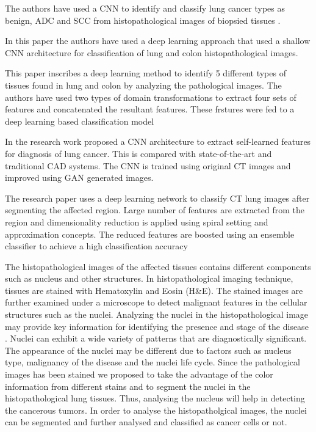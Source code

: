 \documentclass{comjnl}
\begin{document}
The authors have used a CNN to identify and classify lung cancer types as benign, ADC and SCC from histopathological images of biopsied tissues \cite{hatuwal}.

In this paper\cite{sanidhya} the authors have used a deep learning approach that used a shallow CNN architecture for classification of lung and colon histopathological images.

This paper \cite{masud} inscribes a deep learning method to identify 5 different types of tissues found in lung and colon by analyzing the pathological images. The authors have used two types of domain transformations to extract four sets of features and concatenated the resultant features. These frstures were fed to a deep learning based classification model

In \cite{suresh} the research work proposed a CNN architecture to extract self-learned features for diagnosis of lung cancer. This is compared with state-of-the-art and traditional CAD systems. The CNN is trained using original CT images and improved using GAN generated images. 

The research paper \cite{shakeel} uses a deep learning network to classify CT lung images after segmenting the affected region. Large number of features are extracted from the region and dimensionality reduction is applied using spiral setting and approximation concepts. The reduced features are boosted using an ensemble classifier to achieve a high classification accuracy


The histopathological images of the affected tissues contains different components such as nucleus and other structures.  In histopathological imaging technique, tissues are stained with Hematoxylin and Eosin (H&E). The stained images are further examined under a microscope to detect malignant features in the cellular structures such as the nuclei. Analyzing the nuclei in the histopathological image may provide key information for identifying the presence and stage of the disease \cite{confjung}. Nuclei can exhibit a wide variety of patterns that are diagnostically significant. The appearance of the nuclei may be different due to factors such as nucleus type, malignancy of the disease and the nuclei life cycle.  Since the pathological images has been stained we proposed to take the advantage of the color information from different stains and to segment the nuclei in the histopathological lung tissues. Thus, analysing the nucleus will help in detecting the cancerous tumors. In order to analyse the histopatholgical images, the nuclei can be segmented and further analysed and classified as cancer cells or not.
\end{document}
